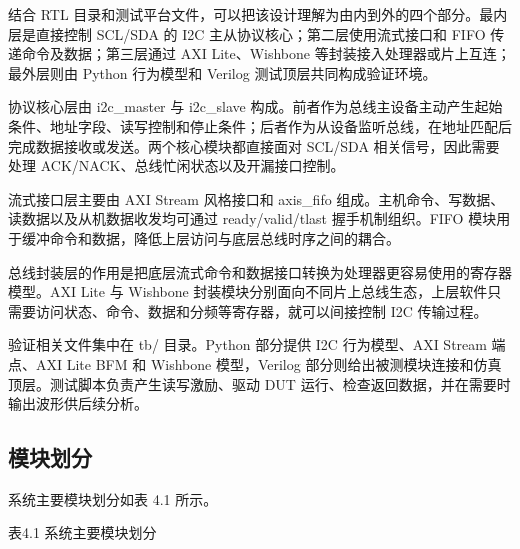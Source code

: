 \documentclass[12pt,a4paper]{article}
\numberwithin{equation}{section}
\begin{document}
结合 RTL
目录和测试平台文件，可以把该设计理解为由内到外的四个部分。最内层是直接控制
SCL/SDA 的 I2C 主从协议核心；第二层使用流式接口和 FIFO
传递命令及数据；第三层通过 AXI Lite、Wishbone
等封装接入处理器或片上互连；最外层则由 Python 行为模型和 Verilog
测试顶层共同构成验证环境。

协议核心层由 i2c\_master 与
i2c\_slave
构成。前者作为总线主设备主动产生起始条件、地址字段、读写控制和停止条件；后者作为从设备监听总线，在地址匹配后完成数据接收或发送。两个核心模块都直接面对
SCL/SDA 相关信号，因此需要处理 ACK/NACK、总线忙闲状态以及开漏接口控制。

流式接口层主要由 AXI Stream 风格接口和
axis\_fifo
组成。主机命令、写数据、读数据以及从机数据收发均可通过 ready/valid/tlast
握手机制组织。FIFO
模块用于缓冲命令和数据，降低上层访问与底层总线时序之间的耦合。

总线封装层的作用是把底层流式命令和数据接口转换为处理器更容易使用的寄存器模型。AXI
Lite 与 Wishbone
封装模块分别面向不同片上总线生态，上层软件只需要访问状态、命令、数据和分频等寄存器，就可以间接控制
I2C 传输过程。

验证相关文件集中在 tb/ 目录。Python 部分提供
I2C 行为模型、AXI Stream 端点、AXI Lite BFM 和 Wishbone 模型，Verilog
部分则给出被测模块连接和仿真顶层。测试脚本负责产生读写激励、驱动 DUT
运行、检查返回数据，并在需要时输出波形供后续分析。

\subsection{模块划分}\label{ux6a21ux5757ux5212ux5206}

系统主要模块划分如表 4.1 所示。

表4.1 系统主要模块划分
\end{document}
